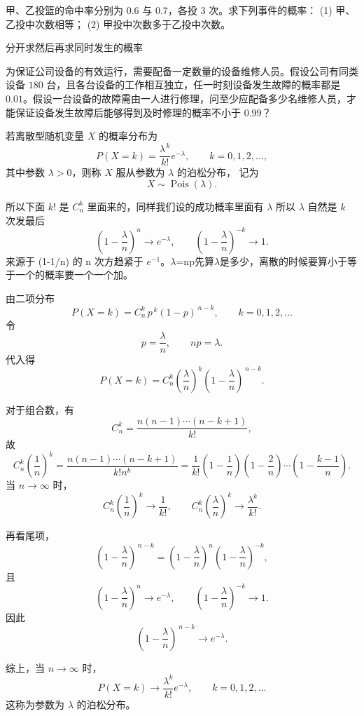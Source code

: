 \begin{homework}[2.9]
甲、乙投篮的命中率分别为 $0.6$ 与 $0.7$，各投 $3$ 次。求下列事件的概率：  
(1) 甲、乙投中次数相等；  
(2) 甲投中次数多于乙投中次数。
\end{homework}
\begin{dxtips}
    分开求然后再求同时发生的概率
\end{dxtips}
\begin{homework}[2.12]
为保证公司设备的有效运行，需要配备一定数量的设备维修人员。假设公司有同类设备 $180$ 台，且各台设备的工作相互独立，任一时刻设备发生故障的概率都是 $0.01$。假设一台设备的故障需由一人进行修理，问至少应配备多少名维修人员，才能保证设备发生故障后能够得到及时修理的概率不小于 $0.99$？
\end{homework}
\begin{definition}[泊松分布]
若离散型随机变量 $X$ 的概率分布为
\[
P(X=k)=\frac{\lambda^{\,k}}{k!}e^{-\lambda},\qquad k=0,1,2,\dots,
\]
其中参数 $\lambda>0$，则称 $X$ 服从参数为 $\lambda$ 的泊松分布，
记为
\[
X\sim \operatorname{Pois}(\lambda).
\]
\end{definition}
\begin{dxtips}[泊松分布是二项分布取极限]
所以下面 \(k!\) 是 \(C_n^k\) 里面来的，同样我们设的成功概率里面有 \(\lambda\) 所以 \(\lambda\) 自然是 \(k\) 次发最后
\[
\left(1-\frac{\lambda}{n}\right)^n \to e^{-\lambda},
\qquad
\left(1-\frac{\lambda}{n}\right)^{-k} \to 1.
\]
来源于 (1-1/n) 的 n 次方趋紧于 \(e^{-1}\)。$\lambda$=np先算$\lambda$是多少，离散的时候要算小于等于一个的概率要一个一个加。
\end{dxtips}
\begin{note}
    由二项分布
\[
P(X=k)=C_n^k\,p^{\,k}(1-p)^{\,n-k},\qquad k=0,1,2,\ldots
\]
令
\[
p=\frac{\lambda}{n},\qquad np=\lambda.
\]
代入得
\[
P(X=k)
= C_n^k\left(\frac{\lambda}{n}\right)^k
\left(1-\frac{\lambda}{n}\right)^{\,n-k}.
\]

对于组合数，有
\[
C_n^k=\frac{n(n-1)\cdots(n-k+1)}{k!},
\]
故
\[
C_n^k\left(\frac{1}{n}\right)^k
=\frac{n(n-1)\cdots(n-k+1)}{k!n^k}
=\frac{1}{k!}
\left(1-\frac{1}{n}\right)
\left(1-\frac{2}{n}\right)
\cdots
\left(1-\frac{k-1}{n}\right).
\]
当 \(n\to\infty\) 时，
\[
C_n^k\left(\frac{1}{n}\right)^k\to\frac{1}{k!},
\qquad
C_n^k\left(\frac{\lambda}{n}\right)^k\to\frac{\lambda^k}{k!}.
\]

再看尾项，
\[
\left(1-\frac{\lambda}{n}\right)^{\,n-k}
=\left(1-\frac{\lambda}{n}\right)^n
\left(1-\frac{\lambda}{n}\right)^{-k},
\]
且
\[
\left(1-\frac{\lambda}{n}\right)^n\to e^{-\lambda},
\qquad
\left(1-\frac{\lambda}{n}\right)^{-k}\to 1.
\]
因此
\[
\left(1-\frac{\lambda}{n}\right)^{\,n-k}\to e^{-\lambda}.
\]

综上，当 \(n\to\infty\) 时，
\[
P(X=k)\to 
\frac{\lambda^k}{k!}e^{-\lambda},
\qquad k=0,1,2,\ldots
\]
这称为参数为 \(\lambda\) 的泊松分布。
\end{note}
